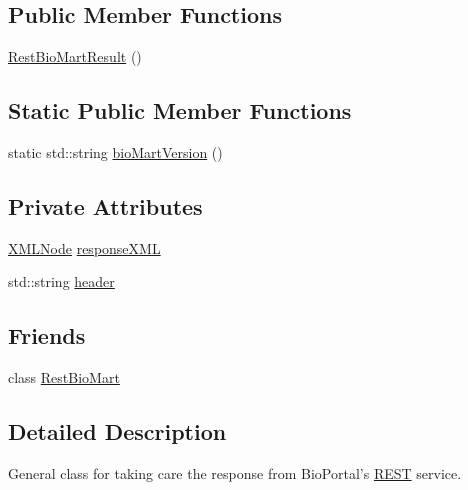 \subsection*{Public Member Functions}
\begin{DoxyCompactItemize}
\item 
\hyperlink{classunisys_1_1RestBioMartResult_aa6e98b295934675ea15aa5054256deac}{Rest\-Bio\-Mart\-Result} ()
\end{DoxyCompactItemize}
\subsection*{Static Public Member Functions}
\begin{DoxyCompactItemize}
\item 
static std\-::string \hyperlink{classunisys_1_1RestBioMartResult_a2ea0a552cac88de1ac1315615f5c5eb1}{bio\-Mart\-Version} ()
\end{DoxyCompactItemize}
\subsection*{Private Attributes}
\begin{DoxyCompactItemize}
\item 
\hyperlink{structXMLNode}{X\-M\-L\-Node} \hyperlink{classunisys_1_1RestBioMartResult_a89a1ffbddcdc023cbe55576a03ebb82d}{response\-X\-M\-L}
\item 
std\-::string \hyperlink{classunisys_1_1RestBioMartResult_a811e33f63dbd761d2723db52825ba525}{header}
\end{DoxyCompactItemize}
\subsection*{Friends}
\begin{DoxyCompactItemize}
\item 
class \hyperlink{classunisys_1_1RestBioMartResult_ae2461bc1573dd7c5c85decdbdc420f06}{Rest\-Bio\-Mart}
\end{DoxyCompactItemize}


\subsection{Detailed Description}
General class for taking care the response from Bio\-Portal's \hyperlink{classunisys_1_1REST}{R\-E\-S\-T} service. 

